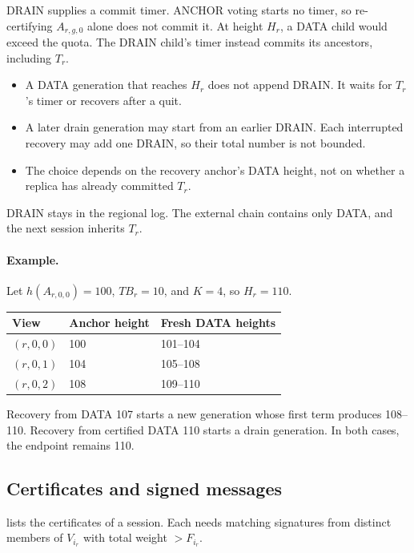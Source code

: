 \documentclass[11pt,a4paper]{article}
\newcommand{\TB}{\mathit{TB}}
\begin{document}
DRAIN supplies a commit timer. ANCHOR voting starts no timer, so
re-certifying $A_{r,g,0}$ alone does not commit it. At height $H_r$, a
DATA child would exceed the quota. The DRAIN child's timer instead
commits its ancestors, including $T_r$.
\begin{itemize}
\item A DATA generation that reaches $H_r$ does not append DRAIN.
It waits for $T_r$'s timer or recovers after a quit.
\item A later drain generation may start from an earlier DRAIN.
Each interrupted recovery may add one DRAIN, so their total number
is not bounded.
\item The choice depends on the recovery anchor's DATA height, not on
whether a replica has already committed $T_r$.
\end{itemize}
DRAIN stays in the regional log. The external chain contains only DATA,
and the next session inherits $T_r$.

\paragraph{Example.}
Let $h(A_{r,0,0})=100$, $\TB_r=10$, and $K=4$, so $H_r=110$.
\begin{center}\small
\begin{tabular}{@{}lll@{}}\toprule
View & Anchor height & Fresh DATA heights\\\midrule
$(r,0,0)$ & 100 & 101--104\\
$(r,0,1)$ & 104 & 105--108\\
$(r,0,2)$ & 108 & 109--110\\\bottomrule
\end{tabular}
\end{center}
Recovery from DATA 107 starts a new generation whose first term produces
108--110. Recovery from certified DATA 110 starts a drain generation.
In both cases, the endpoint remains 110.

\subsection{Certificates and signed messages}
\label{sec:certificates}
 lists the certificates of a session. Each needs
matching signatures from distinct members of $V_{i_r}$ with total weight
$>F_{i_r}$.
\end{document}
